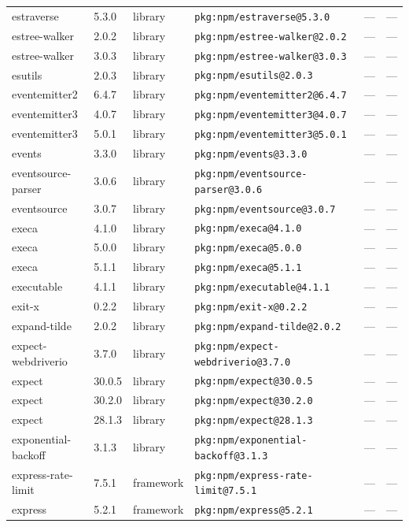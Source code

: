 \documentclass[11pt]{article}
\begin{document}
\begin{longtable}{|l|l|l|p{2.2cm}|l|p{4cm}|}
estraverse & 5.3.0 & library & \texttt{pkg:npm/estraverse@5.3.0} & — & — \\
estree-walker & 2.0.2 & library & \texttt{pkg:npm/estree-walker@2.0.2} & — & — \\
estree-walker & 3.0.3 & library & \texttt{pkg:npm/estree-walker@3.0.3} & — & — \\
esutils & 2.0.3 & library & \texttt{pkg:npm/esutils@2.0.3} & — & — \\
eventemitter2 & 6.4.7 & library & \texttt{pkg:npm/eventemitter2@6.4.7} & — & — \\
eventemitter3 & 4.0.7 & library & \texttt{pkg:npm/eventemitter3@4.0.7} & — & — \\
eventemitter3 & 5.0.1 & library & \texttt{pkg:npm/eventemitter3@5.0.1} & — & — \\
events & 3.3.0 & library & \texttt{pkg:npm/events@3.3.0} & — & — \\
eventsource-parser & 3.0.6 & library & \texttt{pkg:npm/eventsource-parser@3.0.6} & — & — \\
eventsource & 3.0.7 & library & \texttt{pkg:npm/eventsource@3.0.7} & — & — \\
execa & 4.1.0 & library & \texttt{pkg:npm/execa@4.1.0} & — & — \\
execa & 5.0.0 & library & \texttt{pkg:npm/execa@5.0.0} & — & — \\
execa & 5.1.1 & library & \texttt{pkg:npm/execa@5.1.1} & — & — \\
executable & 4.1.1 & library & \texttt{pkg:npm/executable@4.1.1} & — & — \\
exit-x & 0.2.2 & library & \texttt{pkg:npm/exit-x@0.2.2} & — & — \\
expand-tilde & 2.0.2 & library & \texttt{pkg:npm/expand-tilde@2.0.2} & — & — \\
expect-webdriverio & 3.7.0 & library & \texttt{pkg:npm/expect-webdriverio@3.7.0} & — & — \\
expect & 30.0.5 & library & \texttt{pkg:npm/expect@30.0.5} & — & — \\
expect & 30.2.0 & library & \texttt{pkg:npm/expect@30.2.0} & — & — \\
expect & 28.1.3 & library & \texttt{pkg:npm/expect@28.1.3} & — & — \\
exponential-backoff & 3.1.3 & library & \texttt{pkg:npm/exponential-backoff@3.1.3} & — & — \\
express-rate-limit & 7.5.1 & framework & \texttt{pkg:npm/express-rate-limit@7.5.1} & — & — \\
express & 5.2.1 & framework & \texttt{pkg:npm/express@5.2.1} & — & — \\

\end{longtable}
\end{document}
